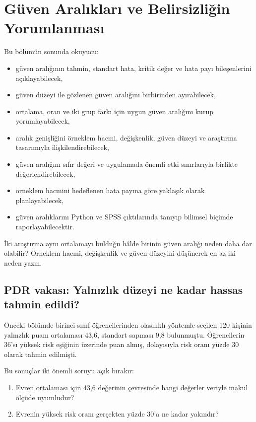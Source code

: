 \chapter{Güven Aralıkları ve Belirsizliğin Yorumlanması}
\label{ch:confidence-intervals}

\begin{hedefler}
Bu bölümün sonunda okuyucu:
\begin{itemize}
  \item güven aralığının tahmin, standart hata, kritik değer ve hata payı bileşenlerini açıklayabilecek,
  \item güven düzeyi ile gözlenen güven aralığını birbirinden ayırabilecek,
  \item ortalama, oran ve iki grup farkı için uygun güven aralığını kurup yorumlayabilecek,
  \item aralık genişliğini örneklem hacmi, değişkenlik, güven düzeyi ve araştırma tasarımıyla ilişkilendirebilecek,
  \item güven aralığını sıfır değeri ve uygulamada önemli etki sınırlarıyla birlikte değerlendirebilecek,
  \item örneklem hacmini hedeflenen hata payına göre yaklaşık olarak planlayabilecek,
  \item güven aralıklarını Python ve SPSS çıktılarında tanıyıp bilimsel biçimde raporlayabilecektir.
\end{itemize}
\end{hedefler}

\begin{hazirlik}
İki araştırma aynı ortalamayı bulduğu hâlde birinin güven aralığı neden daha
dar olabilir? Örneklem hacmi, değişkenlik ve güven düzeyini düşünerek en az iki
neden yazın.
\end{hazirlik}

\section{PDR vakası: Yalnızlık düzeyi ne kadar hassas tahmin edildi?}

Önceki bölümde birinci sınıf öğrencilerinden olasılıklı yöntemle seçilen 120
kişinin yalnızlık puanı ortalaması 43,6, standart sapması 9,8 bulunmuştu.
Öğrencilerin 36'sı yüksek risk eşiğinin üzerinde puan almış, dolayısıyla risk
oranı yüzde 30 olarak tahmin edilmişti.

Bu sonuçlar iki önemli soruyu açık bırakır:

\begin{enumerate}
  \item Evren ortalaması için 43,6 değerinin çevresinde hangi değerler veriyle makul ölçüde uyumludur?
  \item Evrenin yüksek risk oranı gerçekten yüzde 30'a ne kadar yakındır?
\end{enumerate}


